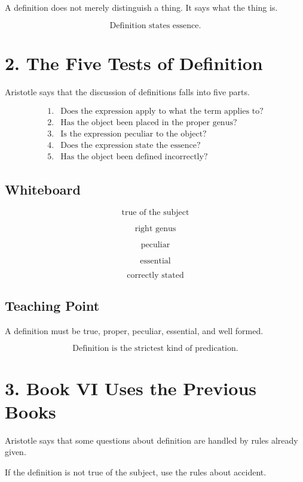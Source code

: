 \documentclass[12pt]{article}
\begin{document}
A definition does not merely distinguish a thing. It says what the thing is.

\[
\boxed{
\text{Definition states essence.}
}
\]

\section*{2. The Five Tests of Definition}

Aristotle says that the discussion of definitions falls into five parts.

\[
\begin{array}{ll}
1. & \text{Does the expression apply to what the term applies to?} \\
2. & \text{Has the object been placed in the proper genus?} \\
3. & \text{Is the expression peculiar to the object?} \\
4. & \text{Does the expression state the essence?} \\
5. & \text{Has the object been defined incorrectly?}
\end{array}
\]

\subsection*{Whiteboard}

\[
\text{true of the subject}
\]

\[
\text{right genus}
\]

\[
\text{peculiar}
\]

\[
\text{essential}
\]

\[
\text{correctly stated}
\]

\subsection*{Teaching Point}

A definition must be true, proper, peculiar, essential, and well formed.

\[
\boxed{
\text{Definition is the strictest kind of predication.}
}
\]

\section*{3. Book VI Uses the Previous Books}

Aristotle says that some questions about definition are handled by rules already
given.

If the definition is not true of the subject, use the rules about accident.
\end{document}
